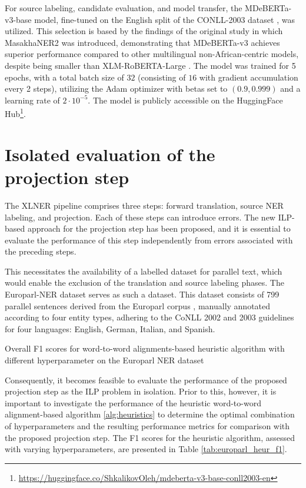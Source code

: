 For source labeling, candidate evaluation, and model transfer, the MDeBERTa-v3-base
model, fine-tuned on the English split of the CONLL-2003 dataset \cite{tjong-kim-sang-de-meulder-2003-introduction-conll},
was utilized. This selection is based by the findings of the original study in which
MasakhaNER2 was introduced, demonstrating that MDeBERTa-v3 achieves superior performance
compared to other multilingual non-African-centric models, despite being smaller than
XLM-RoBERTA-Large \cite{conneau-etal-2020-unsupervised-xlmr}. The model was trained
for 5 epochs, with a total batch size of \( 32 \) (consisting of \( 16 \) with gradient
accumulation every 2 steps), utilizing the Adam optimizer \cite{Kingma2014AdamAM} with
betas set to \( (0.9,0.999) \) and a learning rate of \( 2 \cdot 10^{-5} \). The model
is publicly accessible on the HuggingFace Hub\footnote{\url{https://huggingface.co/ShkalikovOleh/mdeberta-v3-base-conll2003-en}}.

\section{Isolated evaluation of the projection step}
The XLNER pipeline comprises three steps: forward translation, source NER labeling,
and projection. Each of these steps can introduce errors. The new ILP-based approach for the
projection step has been proposed, and it is essential to evaluate the performance
of this step independently from errors associated with the preceding steps.

This necessitates the availability of a labelled dataset for parallel text,
which would enable the exclusion of the translation and source labeling phases.
The Europarl-NER dataset \cite{agerri-etal-2018-building} serves as such a dataset.
This dataset consists of 799 parallel sentences derived from the Europarl corpus \cite{koehn2005europarl}, manually annotated according to four entity types, adhering to the CoNLL 2002 and 2003 guidelines for four languages: English, German, Italian, and Spanish.

\begin{table}[ht]
  \centering
  
  \caption{Overall F1 scores for word-to-word alignments-based heuristic
  algorithm with different hyperparameter  on the Europarl NER dataset}
  \label{tab:europarl_heur_f1}
\end{table}

Consequently, it becomes feasible to evaluate the performance of the proposed
projection step as the ILP problem in isolation. Prior to this, however, it is
important to investigate the performance of the heuristic word-to-word alignment-based
algorithm \ref{alg:heuristics} to determine the optimal combination of hyperparameters
and the resulting performance metrics for comparison with the proposed projection step.
The F1 scores for the heuristic algorithm, assessed with varying hyperparameters, are
presented in Table \ref{tab:europarl_heur_f1}.

